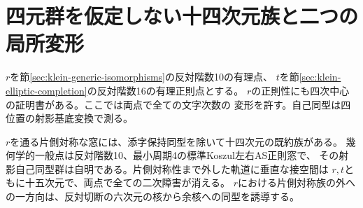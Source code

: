 \section{四元群を仮定しない十四次元族と二つの局所変形}
\label{sec:unrestricted-doublet}
$r$を節\ref{sec:klein-generic-isomorphisms}の反対階数10の有理点、
$t$を節\ref{sec:klein-elliptic-completion}の反対階数16の有理正則点とする。
$r$の正則性にも四次中心の証明書がある。ここでは両点で全ての文字次数の
変形を許す。自己同型は四位置の射影基底変換で測る。

\begin{theorem}\label{thm:unrestricted-doublet}
$r$を通る片側対称な窓には、添字保持同型を除いて十四次元の既約族がある。
幾何学的一般点は反対階数10、最小周期4の標準Koszul左右AS正則窓で、
その射影自己同型群は自明である。片側対称性まで外した軌道に垂直な接空間は
$r,t$ともに十五次元で、両点で全ての二次障害が消える。
$r$における片側対称族の外への一方向は、反対切断の六次元の核から余核への同型を誘導する。
\end{theorem}

